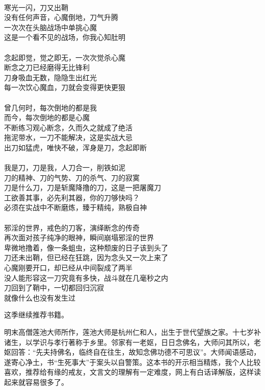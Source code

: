 \begin{adjustwidth}{-1em}{-1em}
    \begin{poem}[戒色刀客]
        \begin{multicols}{2}
            \centering~\\
            寒光一闪，刀又出鞘 \\ 没有任何声音，心魔倒地，刀气升腾 \\ 一次次在头脑战场中单挑心魔 \\ 这是一个看不见的战场，你我心知肚明\\~\\
            念起即觉，觉之即无，一次次觉杀心魔 \\ 断念之刀已经磨得无比锋利 \\ 刀身吸血无数，隐隐生出红光 \\ 每一次饮心魔血，刀就会变得更快更狠\\~\\
            曾几何时，每次倒地的都是我 \\ 而今，每次倒地的都是心魔 \\ 不断练习观心断念，久而久之就成了绝活 \\ 拖泥带水，一刀不能解决，这是实战大忌 \\ 出刀如猛虎，唯快不破，浑身是刀，念起即断\\~\\
            我是刀，刀是我，人刀合一，削铁如泥 \\ 刀的精神、刀的气势、刀的杀气、刀的寂寞 \\ 刀是什么刀，刀是斩魔降撸的刀，这是一把屠魔刀 \\ 工欲善其事，必先利其器，你的刀够快吗？ \\ 必须在实战中不断磨炼，臻于精纯，熟极自神\\~\\
            邪淫的世界，戒色的刀客，演绎断念的传奇 \\ 再次面对孩子纯净的眼神，瞬间崩塌邪淫的世界 \\ 卑微地撸着，像一条蛆虫，这种颓废的日子该到头了 \\ 刀还未出鞘，但已经在狂跳，因为念头又一次上来了 \\ 心魔刚要开口，却已经从中间裂成了两半 \\ 没人能形容这一刀究竟有多快，战斗就在几毫秒之内 \\ 刀回到了鞘中，一切都回归沉寂 \\ 就像什么也没有发生过
        \end{multicols}
    \end{poem}
\end{adjustwidth}

这季继续推荐书籍。

\begin{book}[《竹窗随笔》]
    明末高僧莲池大师所作，莲池大师是杭州仁和人，出生于世代望族之家。十七岁补诸生，以学识与孝行著称于乡里。邻家有一老妪，日日念佛名，大师问其所以，老妪回答：“先夫持佛名，临终自在往生，故知念佛功德不可思议”。大师闻语感动，遂寄心净土，书“生死事大”于案头以自警策。这本书的开示相当精炼，我个人比较喜欢，推荐给有缘的戒友，文言文的理解有一定难度，网上有白话译解版，这样读起来就容易很多了。
\end{book}
